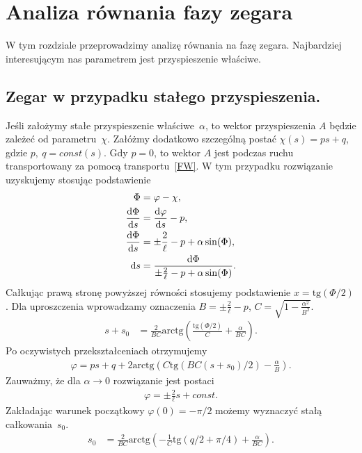 \newpage
\section{Analiza równania fazy zegara}
W tym rozdziale przeprowadzimy analizę równania na fazę zegara.
Najbardziej interesującym nas parametrem jest przyspieszenie właściwe.

\subsection{Zegar w przypadku stałego przyspieszenia.}
Jeśli założymy stałe przyspieszenie właściwe~$\alpha$, to wektor 
przyspieszenia $A$ będzie zależeć od parametru~$\chi$.
Załóżmy dodatkowo szczególną postać $\chi (s) = p s + q$, 
gdzie $p,\ q = const(s)$.  Gdy $p=0$, to wektor $A$ jest podczas ruchu
transportowany za pomocą transportu~\eqref{FW}.  
W tym przypadku rozwiązanie uzyskujemy stosując  
podstawienie
\begin{align} \label{analiza_podstawienie1}
\Phi &= \varphi - \chi,\\
\frac{\text{d} \Phi}{\text{d} s} &= \frac{\text{d} \varphi }{\text{d} s} - p,  \nonumber \\
\frac{\text{d} \Phi}{\text{d} s} &= \pm \frac{2}{\ell} - p  + 
\alpha \sin (\Phi ) ,  \nonumber \\
\text{d} s & = \frac{\text{d} \Phi}{ \pm \frac{2}{\ell} - p  + 
\alpha \sin (\Phi ) } . \nonumber
\end{align}
Całkując prawą stronę powyższej równości stosujemy podstawienie
 $ x = \text{tg} (\Phi/2)$. Dla uproszczenia wprowadzamy oznaczenia
$B = \pm \frac{2}{\ell} - p $,
$C =  \sqrt{ 1 - \frac{\alpha^2}{B^2}}$. 
\begin{align*}
s +s_0 & = \frac{2}{BC} \text{arctg}  
\left( \frac{ \text{tg} (\Phi/2)}{C} +\frac{\alpha}{BC} \right).
\end{align*}
Po oczywistych przekształceniach otrzymujemy 
\begin{align*}
\varphi = ps + q + 
2\text{arctg} \left( 
C \text{tg} \left( BC(s + s_0)/2\right)  - \frac{\alpha}{B}
\right) .
\end{align*}
Zauważmy, że dla $\alpha \to 0$ rozwiązanie jest 
postaci
\begin{align}\nonumber
\varphi = \pm \frac{2}{\ell} s + const.
\end{align}
Zakładając warunek początkowy $\varphi(0) = -\pi/2$
 możemy wyznaczyć stałą całkowania~$s_0$.
\begin{align*}
s_0 & = \frac{2}{BC} \text{arctg}  
\left( - \frac{1}{C}\text{tg} (q/2 + \pi/4) +\frac{\alpha}{BC} \right).
\end{align*}

